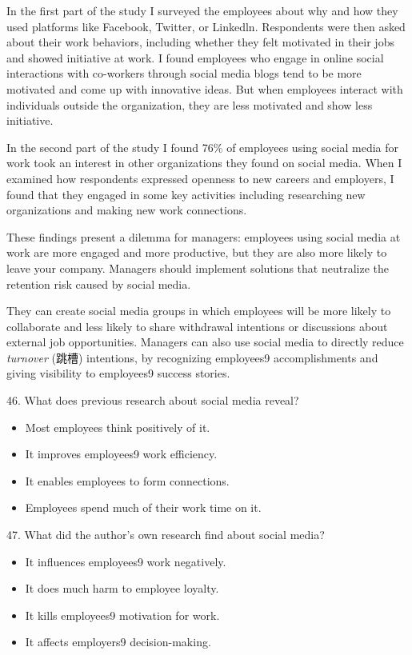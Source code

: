 \documentclass[UTF8,11pt]{ctexart}
\begin{document}
In the first part of the study I surveyed the employees about why and how they used platforms like Facebook, Twitter, or Linkedln. Respondents were then asked about their work behaviors, including whether they felt motivated in their jobs and showed initiative at work. I found employees who engage in online social interactions with co-workers through social media blogs tend to be more motivated and come up with innovative ideas. But when employees interact with individuals outside the organization, they are less motivated and show less initiative.


In the second part of the study I found 76\% of employees using social media for work took an interest in other organizations they found on social media. When I examined how respondents expressed openness to new careers and employers, I found that they engaged in some key activities including researching new organizations and making new work connections.


These findings present a dilemma for managers: employees using social media at work are more engaged and more productive, but they are also more likely to leave your company. Managers should implement solutions that neutralize the retention risk caused by social media.


They can create social media groups in which employees will be more likely to collaborate and less likely to share withdrawal intentions or discussions about external job opportunities. Managers can also use social media to directly reduce \textit{turnover} (跳槽) intentions, by recognizing employees9 accomplishments and giving visibility to employees9 success stories.


46. What does previous research about social media reveal?


\begin{itemize}[leftmargin=2em,itemsep=.2em,topsep=.4em]\item[A.] Most employees think positively of it.
\item[B.] It improves employees9 work efficiency.
\item[C.] It enables employees to form connections.
\item[D.] Employees spend much of their work time on it.
\end{itemize}

47. What did the author's own research find about social media?


\begin{itemize}[leftmargin=2em,itemsep=.2em,topsep=.4em]\item[A.] It influences employees9 work negatively.
\item[B.] It does much harm to employee loyalty.
\item[C.] It kills employees9 motivation for work.
\item[D.] It affects employers9 decision-making.
\end{itemize}
\end{document}
